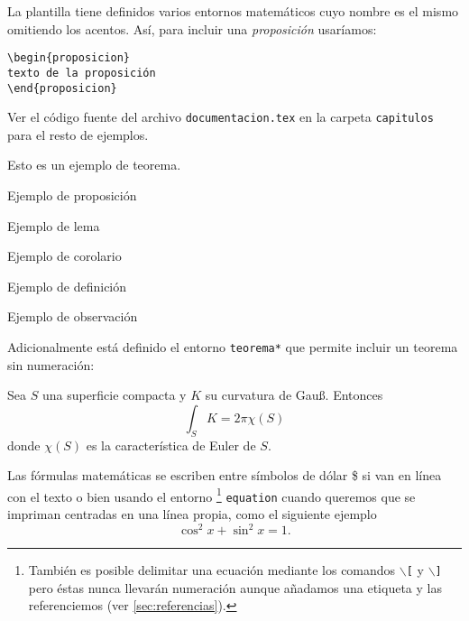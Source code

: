 La plantilla tiene definidos varios entornos matemáticos cuyo nombre es el mismo omitiendo los acentos. Así, para incluir una \emph{proposición} usaríamos:

\begin{verbatim}
\begin{proposicion}
texto de la proposición
\end{proposicion} 
\end{verbatim}

Ver el código fuente del archivo \texttt{documentacion.tex} en la carpeta \texttt{capitulos} para el resto de ejemplos.

\begin{teorema}\label{thm:teorema}
Esto es un ejemplo de teorema.
\end{teorema}

\begin{proposicion}
Ejemplo de proposición
\end{proposicion}

\begin{lema}
Ejemplo de lema
\end{lema}

\begin{corolario}
Ejemplo de corolario
\end{corolario}

\begin{definicion}
Ejemplo de definición
\end{definicion}

\begin{observacion}
Ejemplo de observación
\end{observacion}

Adicionalmente está definido el entorno \texttt{teorema*} que permite incluir un teorema sin numeración:

\begin{teorema*}
  Sea $S$ una superficie compacta y $K$ su curvatura de Gauß. Entonces
\begin{equation}
  \int_S K = 2\pi\chi(S)
\end{equation}
donde $\chi(S)$ es la característica de Euler de $S$.
\end{teorema*}

Las fórmulas matemáticas se escriben entre símbolos de dólar \$ si van en línea con el texto o bien usando el entorno%
\footnote{
  También es posible delimitar una ecuación mediante los comandos \texttt{$\backslash$[} y \texttt{$\backslash$]} pero éstas nunca llevarán numeración aunque añadamos una etiqueta y las referenciemos (ver \autoref{sec:referencias}).
} 
\texttt{equation} cuando queremos que se impriman centradas en una línea propia, como el siguiente ejemplo
\begin{equation}\label{eq:identidad-pitagorica}
  \cos^2 x + \sin^2 x = 1.
\end{equation}


